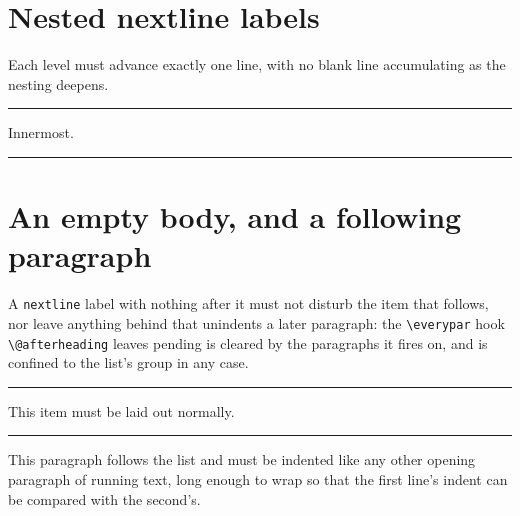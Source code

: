 \documentclass{article}
\begin{document}
\section{Nested nextline labels}

Each level must advance exactly one line, with no blank line accumulating as
the nesting deepens.

\noindent\rule{\textwidth}{0.3pt}
\begin{prop}
  \item[Outer, align=nextline]
  \begin{prop}
    \item[Inner, align=nextline]
    \begin{prop}
      \item Innermost.
    \end{prop}
  \end{prop}
\end{prop}
\noindent\rule{\textwidth}{0.3pt}

\section{An empty body, and a following paragraph}

A \verb|nextline| label with nothing after it must not disturb the item that
follows, nor leave anything behind that unindents a later paragraph: the
\verb|\everypar| hook \verb|\@afterheading| leaves pending is cleared by the
paragraphs it fires on, and is confined to the list's group in any case.

\noindent\rule{\textwidth}{0.3pt}
\begin{prop}
  \item[Empty body, align=nextline]
  \item[Next item] This item must be laid out normally.
\end{prop}
\noindent\rule{\textwidth}{0.3pt}

This paragraph follows the list and must be indented like any other opening
paragraph of running text, long enough to wrap so that the first line's indent
can be compared with the second's.
\end{document}
